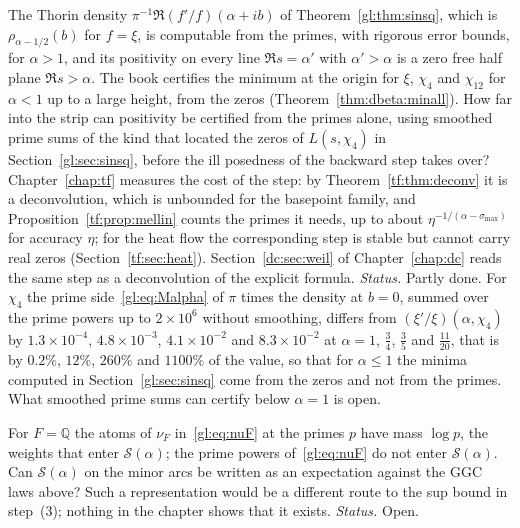 \begin{problem}\label{gl:op:backward}
The Thorin density $\pi^{-1}\Re(f'/f)(\alpha+ib)$ of Theorem~\ref{gl:thm:sinsq}, which is $\rho_{\alpha-1/2}(b)$ for $f=\xi$, is computable from the primes, with rigorous error bounds, for $\alpha>1$, and its positivity on every line $\Re s=\alpha'$ with $\alpha'>\alpha$ is a zero free half plane $\Re s>\alpha$. The book certifies the minimum at the origin for $\xi$, $\chi_4$ and $\chi_{12}$ for $\alpha<1$ up to a large height, from the zeros (Theorem~\ref{thm:dbeta:minall}). How far into the strip can positivity be certified from the primes alone, using smoothed prime sums of the kind that located the zeros of $L(s,\chi_4)$ in Section~\ref{gl:sec:sinsq}, before the ill posedness of the backward step takes over? Chapter~\ref{chap:tf} measures the cost of the step: by Theorem~\ref{tf:thm:deconv} it is a deconvolution, which is unbounded for the basepoint family, and Proposition~\ref{tf:prop:mellin} counts the primes it needs, up to about $\eta^{-1/(\alpha-\sigma_{\max})}$ for accuracy $\eta$; for the heat flow the corresponding step is stable but cannot carry real zeros (Section~\ref{tf:sec:heat}). Section~\ref{dc:sec:weil} of Chapter~\ref{chap:dc} reads the same step as a deconvolution of the explicit formula. \emph{Status.} Partly done. For $\chi_4$ the prime side~\eqref{gl:eq:Malpha} of $\pi$ times the density at $b=0$, summed over the prime powers up to $2\times10^6$ without smoothing, differs from $(\xi'/\xi)(\alpha,\chi_4)$ by $1.3\times10^{-4}$, $4.8\times10^{-3}$, $4.1\times10^{-2}$ and $8.3\times10^{-2}$ at $\alpha=1$, $\tfrac34$, $\tfrac35$ and $\tfrac{11}{20}$, that is by $0.2\%$, $12\%$, $260\%$ and $1100\%$ of the value, so that for $\alpha\le1$ the minima computed in Section~\ref{gl:sec:sinsq} come from the zeros and not from the primes. What smoothed prime sums can certify below $\alpha=1$ is open.
\end{problem}

\begin{problem}\label{gl:op:arith}
For $F=\mathbb Q$ the atoms of $\nu_F$ in~\eqref{gl:eq:nuF} at the primes $p$ have mass $\log p$, the weights that enter $\mathcal S(\alpha)$; the prime powers of~\eqref{gl:eq:nuF} do not enter $\mathcal S(\alpha)$. Can $\mathcal S(\alpha)$ on the minor arcs be written as an expectation against the GGC laws above? Such a representation would be a different route to the sup bound in step~(3); nothing in the chapter shows that it exists. \emph{Status.} Open.
\end{problem}

